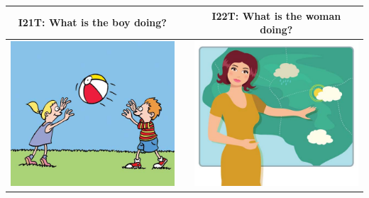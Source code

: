 \documentclass[12pt,notitlepage]{article}
\begin{document}
\begin{center}
\begin{tabular}{|c|c|c|}
\hline
I21T: What is the boy doing? && I22T: What is the woman doing? \\
\hline
\includegraphics[width=20em,trim=0 0 0 -3]{figures/I21.jpg} & & \includegraphics[width=20em,trim=0 0 0 -3]{figures/I22.jpg} \\
\hline
\end{tabular}
\vspace{1em} \\



\end{center}
\end{document}
